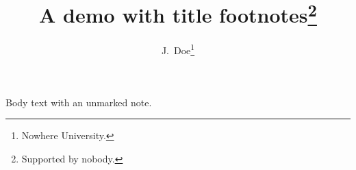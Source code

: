 \documentclass{article}
\title{A demo with title footnotes\thanks{Supported by nobody.}}
\author{J.~Doe\thanks{Nowhere University.}}
\date{}
\begin{document}
\maketitle
Body text with an unmarked note.
\end{document}
